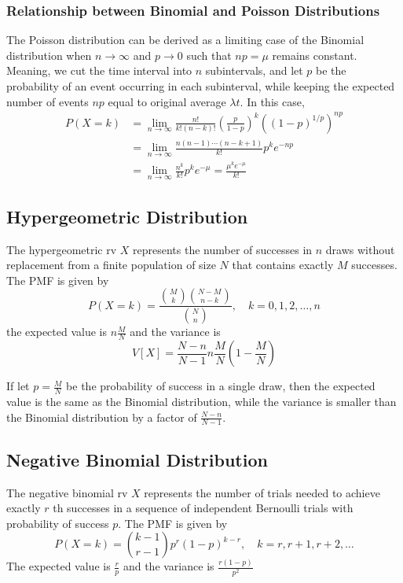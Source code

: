 \documentclass{template}
\begin{document}
\subsubsection{Relationship between Binomial and Poisson Distributions}
The Poisson distribution can be derived as a limiting case of the Binomial 
distribution when \( n \to \infty \) and \( p \to 0 \) such that \( np = \mu \) remains
constant. 
Meaning, we cut the time interval into \( n \) subintervals, and let \( p \) be the probability
of an event occurring in each subinterval, while keeping the expected number of events
$np$ equal to original average $\lambda t$.
In this case,
\[
	\begin{aligned}
		P(X=k) &= \lim_{n \to \infty} \frac{n!}{k!(n-k)!} \left(\frac{p}{1-p}\right)^k
		((1-p)^{1/p})^{np}\\
					 &= \lim_{n \to \infty} \frac{n(n-1)\cdots(n-k+1)}{k!} p^k e^{-np}\\
					 &= \lim_{n \to \infty} \frac{n^k}{k!} p^k e^{-\mu}
					 = \frac{\mu^k e^{-\mu}}{k!}
	\end{aligned}
\] 


\subsection{Hypergeometric Distribution}
The hypergeometric rv \( X \) represents the number of successes in \( n \) draws
without replacement from a finite population of size \( N \) that contains
exactly \( M \) successes. The PMF is given by
\[
	P(X=k) = \frac{\binom{M}{k}\binom{N-M}{n-k}}{\binom{N}{n}}, \quad k=0,1,2,\ldots,n
\] 
the expected value is \( n\frac{M}{N} \)
and the variance is
\[
	V[X] = \frac{N-n}{N-1} n \frac{M}{N} \left(1-\frac{M}{N}\right)
\] 
\begin{remark}
	If let \( p = \frac{M}{N} \) be the probability of success in a single draw, then
	the expected value is the same as the Binomial distribution, while the variance
	is smaller than the Binomial distribution by a factor of \( \frac{N-n}{N-1} \).
\end{remark}

\subsection{Negative Binomial Distribution}
The negative binomial rv \( X \) represents the number of trials needed to achieve
exactly \( r \) th successes in a sequence of independent Bernoulli trials with
probability of success \( p \). The PMF is given by
\[
	P(X=k) = \binom{k-1}{r-1} p^r (1-p)^{k-r}, \quad k=r,r+1,r+2,\ldots
\] 
The expected value is \( \frac{r}{p} \)
and the variance is \( \frac{r(1-p)}{p^2} \)
\end{document}
